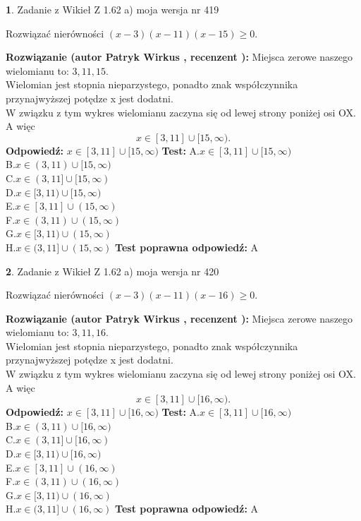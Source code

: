 \documentclass[12pt, a4paper]{article}
\theoremstyle{definition} %
\newtheorem{zad}{}
\newcommand{\zadStart}[1]{\begin{zad}#1\newline}
\newcommand{\zadStop}{\end{zad}}
\newcommand{\rozwStart}[2]{\noindent \textbf{Rozwiązanie (autor #1 , recenzent #2): }\newline}
\newcommand{\rozwStop}{\newline}
\newcommand{\odpStart}{\noindent \textbf{Odpowiedź:}\newline}
\newcommand{\odpStop}{\newline}
\newcommand{\testStart}{\noindent \textbf{Test:}\newline}
\newcommand{\testStop}{\newline}
\newcommand{\kluczStart}{\noindent \textbf{Test poprawna odpowiedź:}\newline}
\newcommand{\kluczStop}{\newline}
\begin{document}
\zadStart{Zadanie z Wikieł Z 1.62 a) moja wersja nr 419}

Rozwiązać nierówności $(x-3)(x-11)(x-15)\ge0$.
\zadStop
\rozwStart{Patryk Wirkus}{}
Miejsca zerowe naszego wielomianu to: $3, 11, 15$.\\
Wielomian jest stopnia nieparzystego, ponadto znak współczynnika przy\linebreak najwyższej potędze x jest dodatni.\\ W związku z tym wykres wielomianu zaczyna się od lewej strony poniżej osi OX. A więc $$x \in [3,11] \cup [15,\infty).$$
\rozwStop
\odpStart
$x \in [3,11] \cup [15,\infty)$
\odpStop
\testStart
A.$x \in [3,11] \cup [15,\infty)$\\
B.$x \in (3,11) \cup [15,\infty)$\\
C.$x \in (3,11] \cup [15,\infty)$\\
D.$x \in [3,11) \cup [15,\infty)$\\
E.$x \in [3,11] \cup (15,\infty)$\\
F.$x \in (3,11) \cup (15,\infty)$\\
G.$x \in [3,11) \cup (15,\infty)$\\
H.$x \in (3,11] \cup (15,\infty)$
\testStop
\kluczStart
A
\kluczStop



\zadStart{Zadanie z Wikieł Z 1.62 a) moja wersja nr 420}

Rozwiązać nierówności $(x-3)(x-11)(x-16)\ge0$.
\zadStop
\rozwStart{Patryk Wirkus}{}
Miejsca zerowe naszego wielomianu to: $3, 11, 16$.\\
Wielomian jest stopnia nieparzystego, ponadto znak współczynnika przy\linebreak najwyższej potędze x jest dodatni.\\ W związku z tym wykres wielomianu zaczyna się od lewej strony poniżej osi OX. A więc $$x \in [3,11] \cup [16,\infty).$$
\rozwStop
\odpStart
$x \in [3,11] \cup [16,\infty)$
\odpStop
\testStart
A.$x \in [3,11] \cup [16,\infty)$\\
B.$x \in (3,11) \cup [16,\infty)$\\
C.$x \in (3,11] \cup [16,\infty)$\\
D.$x \in [3,11) \cup [16,\infty)$\\
E.$x \in [3,11] \cup (16,\infty)$\\
F.$x \in (3,11) \cup (16,\infty)$\\
G.$x \in [3,11) \cup (16,\infty)$\\
H.$x \in (3,11] \cup (16,\infty)$
\testStop
\kluczStart
A
\kluczStop
\end{document}
